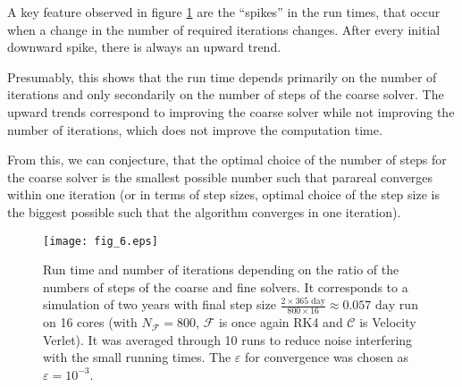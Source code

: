 \documentclass[conference]{IEEEtran}
\begin{document}
A key feature observed in figure \ref{timetest} are the ``spikes'' in the run times, that occur when a change in the number of required iterations changes. After every initial downward spike, there is always an upward trend. 

Presumably, this shows that the run time depends primarily on the number of iterations and only secondarily on the number of steps of the coarse solver. The upward trends correspond to improving the coarse solver while not improving the number of iterations, which does not improve the computation time.

From this, we can conjecture, that the optimal choice of the number of steps for the coarse solver is the smallest possible number such that parareal converges within one iteration (or in terms of step sizes, optimal choice of the step size is the biggest possible such that the algorithm converges in one iteration).

\begin{figure}[htbp]
\centerline{\texttt{[image: fig\_6.eps]}}
\caption{Run time and number of iterations depending on the ratio of the numbers of steps of the coarse and fine solvers. It corresponds to a simulation of two years with final step size $\frac{2\times365\text{ day}}{800\times 16} \approx 0.057\text{ day}$ run on 16 cores (with $N_\mathcal{F} = 800$, $\mathcal{F}$ is once again RK4 and $\mathcal{C}$ is Velocity Verlet). It was averaged through 10 runs to reduce noise interfering with the small running times. The $\varepsilon$ for convergence was chosen as $\varepsilon = 10^{-3}$.}
\label{timetest}
\end{figure}
\end{document}
